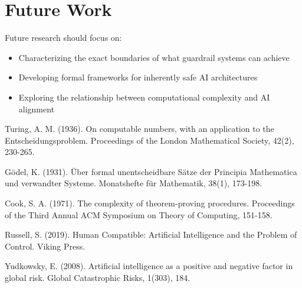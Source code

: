 \documentclass[11pt]{article}
\begin{document}
\section{Future Work}

Future research should focus on:
\begin{itemize}
    \item Characterizing the exact boundaries of what guardrail systems can achieve
    \item Developing formal frameworks for inherently safe AI architectures
    \item Exploring the relationship between computational complexity and AI alignment
\end{itemize}


\begin{thebibliography}{9}

Turing, A. M. (1936). On computable numbers, with an application to the Entscheidungsproblem. Proceedings of the London Mathematical Society, 42(2), 230-265.

Gödel, K. (1931). Über formal unentscheidbare Sätze der Principia Mathematica und verwandter Systeme. Monatshefte für Mathematik, 38(1), 173-198.

Cook, S. A. (1971). The complexity of theorem-proving procedures. Proceedings of the Third Annual ACM Symposium on Theory of Computing, 151-158.

Russell, S. (2019). Human Compatible: Artificial Intelligence and the Problem of Control. Viking Press.

Yudkowsky, E. (2008). Artificial intelligence as a positive and negative factor in global risk. Global Catastrophic Risks, 1(303), 184.

\end{thebibliography}
\end{document}
